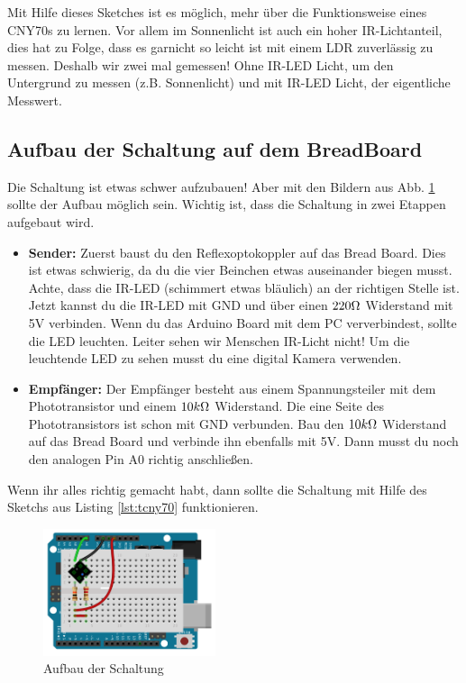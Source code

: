 Mit Hilfe dieses Sketches ist es möglich, mehr über die Funktionsweise eines CNY70s zu lernen. Vor allem im Sonnenlicht ist auch ein hoher IR-Lichtanteil, dies hat zu Folge, dass es garnicht so leicht ist mit einem LDR zuverlässig zu messen. Deshalb wir zwei mal gemessen! Ohne IR-LED Licht, um den Untergrund zu messen (z.B. Sonnenlicht) und mit IR-LED Licht, der eigentliche Messwert. 

\subsection{Aufbau der Schaltung auf dem BreadBoard} 


Die Schaltung ist etwas schwer aufzubauen! Aber mit den Bildern aus Abb. \ref{fig:cny70breadboard}
sollte  der Aufbau möglich sein. Wichtig ist, dass die Schaltung in zwei Etappen aufgebaut wird.
\begin{itemize}
  \item[1.)] \textbf{Sender:} Zuerst baust du den Reflexoptokoppler auf das Bread Board. Dies ist etwas schwierig, da du die vier Beinchen etwas auseinander biegen musst. Achte, dass die IR-LED (schimmert etwas bläulich) an der richtigen Stelle ist. Jetzt kannst du die IR-LED mit GND und über einen $220\Omega$ Widerstand mit 5V verbinden. Wenn du das Arduino Board mit dem PC ververbindest, sollte die LED leuchten. Leiter sehen wir Menschen IR-Licht nicht! Um die leuchtende LED zu sehen musst du eine digital Kamera verwenden.
  \item[2.)] \textbf{Empfänger:}  Der Empfänger besteht aus einem Spannungsteiler mit dem Phototransistor und einem $10k\Omega$ Widerstand. Die eine Seite des Phototransistors ist schon mit GND verbunden. Bau den $10k\Omega$ Widerstand auf das Bread Board und verbinde ihn ebenfalls mit 5V. Dann musst du noch den analogen Pin A0 richtig anschließen.
\end{itemize}
Wenn ihr alles richtig gemacht habt, dann sollte die Schaltung mit Hilfe des Sketchs aus Listing \ref{lst:tcny70} funktionieren.


\begin{figure}[h]
\begin{center}
\includegraphics[width=0.45\textwidth]{Kapitel2/Bilder/cny70bb}
\caption{Aufbau der Schaltung}
\label{fig:cny70breadboard}
\end{center}
\end{figure}



